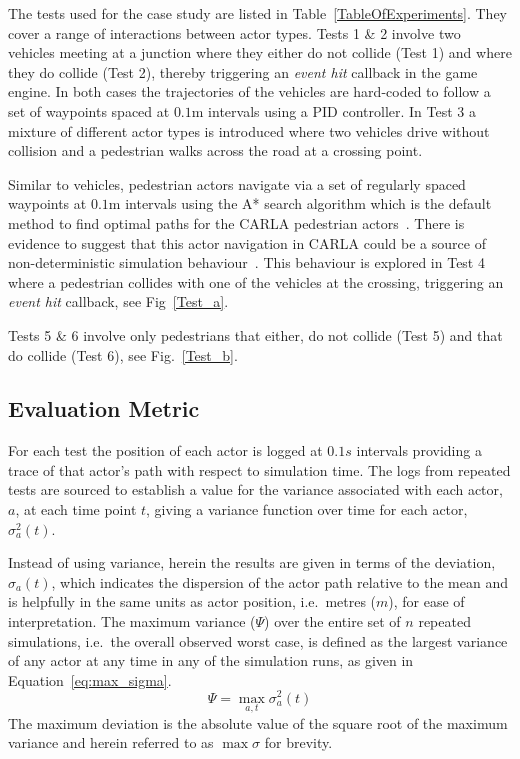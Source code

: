 The tests used for the case study are listed in Table~\ref{TableOfExperiments}. They cover a range of interactions between actor types. 
%
Tests 1 \& 2 involve two vehicles meeting at a junction where they either do not collide (Test 1) and where they do collide (Test 2), thereby triggering an \textit{event hit} callback in the game engine. In both cases the trajectories of the vehicles are hard-coded to follow a set of waypoints spaced at $0.1$m intervals using a PID controller. 
%
In Test 3 a mixture of different actor types is introduced where two vehicles drive without collision and a pedestrian walks across the road at a crossing point. 

Similar to vehicles, pedestrian actors navigate via a set of regularly spaced waypoints at $0.1$m intervals using the A* search algorithm which is the default method to find optimal paths for the CARLA pedestrian actors~\cite{newton2016unreal}. 
%
There is evidence to suggest that this actor navigation in CARLA could be a source of non-deterministic simulation behaviour~\cite{CARLABenchmark}. 
%
This behaviour is explored in Test 4 where a pedestrian collides with one of the vehicles at the crossing, triggering an \textit{event hit} callback, see Fig~\ref{Test_a}.  
%

Tests 5 \& 6 involve only pedestrians that either, do not collide (Test 5) and that do collide (Test 6), see Fig.~\ref{Test_b}. 


\subsection{Evaluation Metric}\label{s:Experiment_Description}
For each test the position of each actor is logged at $0.1s$ intervals providing a trace of that actor's path with respect to simulation time. The logs from repeated tests are sourced to establish a value for the variance associated with each actor, $a$, at each time point $t$, giving a variance function over time for each actor, $\sigma_a^{2}(t)$.

Instead of using variance, herein the results are given in terms of the deviation, $\sigma_a(t)$, which indicates the dispersion of the actor path relative to the mean and is helpfully in the same units as actor position, i.e.\ metres ($m$), for ease of interpretation. The maximum variance ($\Psi$) over the entire set of $n$ repeated simulations, i.e.\ the overall observed worst case, is defined as the largest variance of any actor at any time in any of the simulation runs, as given in Equation~\ref{eq:max_sigma}. 
\begin{equation} \label{eq:max_sigma}
\Psi = \max_{a,t}\sigma_a^{2}(t)
\end{equation}
The maximum deviation is the absolute value of the square root of the maximum variance and herein referred to as ${\max\sigma}$ for brevity. 

